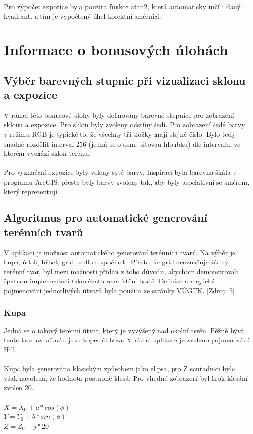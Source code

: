 \documentclass[a4paper, 12pt]{article}
\begin{document}
\

Pro výpočet expozice byla použita funkce atan2, která automaticky určí i daný kvadrant, a tím je vypočtený úhel korektní směrnicí.

\section{Informace o bonusových úlohách}
\subsection{Výběr barevných stupnic při vizualizaci sklonu a expozice}
V rámci této bonusové úlohy byly definovány barevné stupnice pro zobrazení sklonu a expozice. Pro sklon byly zvoleny odstíny šedi. Pro zobrazení šedé barvy v režimu RGB je typické to, že všechny tři složky mají stejné číslo. Bylo tedy snadné rozdělit interval 256 (jedná se o osmi bitovou hloubku) dle intervalu, ve kterém vychází sklon terénu.\\
\\
Pro vyznačení expozice byly voleny syté barvy. Inspirací byla barevná škála v programu ArcGIS, přesto byly barvy zvoleny tak, aby byly asociativní se směrem, který reprezentují.

\subsection{Algoritmus pro automatické generování terénních tvarů}
V aplikaci je možnost automatického generování terénních tvarů. Na výběr je kupa, údolí, hřbet, grid, sedlo a spočinek. Přesto, že grid neoznačuje žádný terénní tvar, byl mezi možnosti přidán z toho důvodu, abychom demonstrovali špatnou implementaci takovéhoto rozmístění bodů. Definice a anglická pojmenování jednotlivých útvarů byla použita ze stránky VÚGTK. [Zdroj: 5]

\subsubsection{Kupa}
Jedná se o takový terénní útvar, který je vyvýšený nad okolní terén. Běžně bývá tento tvar označován jako kopec či hora. V rámci aplikace je zvoleno pojmenování Hill. \\
\\
Kupa byla generována klasickým způsobem jako elipsa, pro Z souřadnici bylo však navolena, že hodnota postupně klesá. Pro vhodné zobrazení byl krok klesání zvolen 20.\\
\\
$ X = X_0 + a * cos(\phi)$ \\
$ Y = Y_0 + b * sin(\phi) $ \\
$ Z = Z_0 - j* 20 $ \\
\end{document}
